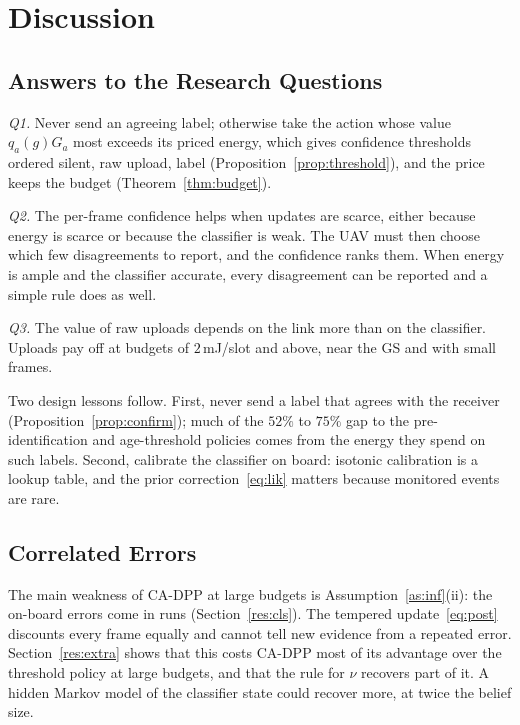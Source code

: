 \documentclass[10pt,journal,compsoc]{IEEEtran}
\theoremstyle{remark}
\begin{document}
\section{Discussion}\label{sec:discussion}
\subsection{Answers to the Research Questions}
\emph{Q1.} Never send an agreeing label; otherwise take the action whose value $q_a(g)G_a$ most exceeds its priced energy, which gives confidence thresholds ordered silent, raw upload, label (Proposition~\ref{prop:threshold}), and the price keeps the budget (Theorem~\ref{thm:budget}).

\emph{Q2.} The per-frame confidence helps when updates are scarce, either because energy is scarce or because the classifier is weak. The UAV must then choose which few disagreements to report, and the confidence ranks them. When energy is ample and the classifier accurate, every disagreement can be reported and a simple rule does as well.

\emph{Q3.} The value of raw uploads depends on the link more than on the classifier. Uploads pay off at budgets of $2$\,mJ/slot and above, near the GS and with small frames.

Two design lessons follow. First, never send a label that agrees with the receiver (Proposition~\ref{prop:confirm}); much of the $52\%$ to $75\%$ gap to the pre-identification and age-threshold policies comes from the energy they spend on such labels. Second, calibrate the classifier on board: isotonic calibration is a lookup table, and the prior correction~\eqref{eq:lik} matters because monitored events are rare.

\subsection{Correlated Errors}
The main weakness of CA-DPP at large budgets is Assumption~\ref{as:inf}(ii): the on-board errors come in runs (Section~\ref{res:cls}). The tempered update~\eqref{eq:post} discounts every frame equally and cannot tell new evidence from a repeated error. Section~\ref{res:extra} shows that this costs CA-DPP most of its advantage over the threshold policy at large budgets, and that the rule for $\nu$ recovers part of it. A hidden Markov model of the classifier state could recover more, at twice the belief size.
\end{document}

